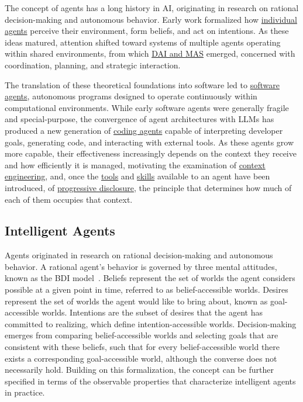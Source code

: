 \documentclass[
english,                 %
bibtex,                  %
]{kththesis}
\numberwithin{listing}{chapter}
\begin{document}
The concept of agents has a long history in \gls{AI}, originating in research on rational decision-making and autonomous behavior. Early work formalized how \hyperref[sec:bg_intelligent_agents]{individual agents} perceive their environment, form beliefs, and act on intentions. As these ideas matured, attention shifted toward systems of multiple agents operating within shared environments, from which \hyperref[sec:bg_distributed_artificial_intelligence]{\gls{DAI} and \gls{MAS}} emerged, concerned with coordination, planning, and strategic interaction.

The translation of these theoretical foundations into software led to \hyperref[sec:bg_software_agents]{software agents}, autonomous programs designed to operate continuously within computational environments. While early software agents were generally fragile and special-purpose, the convergence of agent architectures with \glspl{LLM} has produced a new generation of \hyperref[sec:bg_coding_agents]{coding agents} capable of interpreting developer goals, generating code, and interacting with external tools. As these agents grow more capable, their effectiveness increasingly depends on the context they receive and how efficiently it is managed, motivating the examination of \hyperref[sec:bg_context_engineering]{context engineering}, and, once the \hyperref[sec:bg_tools]{tools} and \hyperref[sec:bg_agent_skills]{skills} available to an agent have been introduced, of \hyperref[sec:bg_progressive_disclosure]{progressive disclosure}, the principle that determines how much of each of them occupies that context.

\subsection{Intelligent Agents}
\label{sec:bg_intelligent_agents}
\glsresetall

Agents originated in research on rational decision-making and autonomous behavior. A rational agent’s behavior is governed by three mental attitudes, known as the \gls{BDI} model~\cite{rao_modeling_1991}. Beliefs represent the set of worlds the agent considers possible at a given point in time, referred to as belief-accessible worlds. Desires represent the set of worlds the agent would like to bring about, known as goal-accessible worlds. Intentions are the subset of desires that the agent has committed to realizing, which define intention-accessible worlds. Decision-making emerges from comparing belief-accessible worlds and selecting goals that are consistent with these beliefs, such that for every belief-accessible world there exists a corresponding goal-accessible world, although the converse does not necessarily hold. Building on this formalization, the concept can be further specified in terms of the observable properties that characterize intelligent agents in practice.
\end{document}

